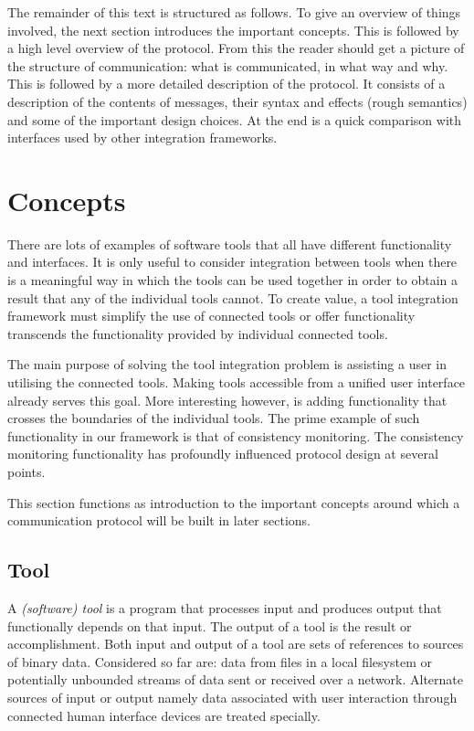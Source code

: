 \documentclass{article}
\begin{document}
  The remainder of this text is structured as follows. To give an overview of
  things involved, the next section introduces the important concepts. This is
  followed by a high level overview of the protocol. From this the reader
  should get a picture of the structure of communication: what is communicated,
  in what way and why. This is followed by a more detailed description of the
  protocol. It consists of a description of the contents of messages, their
  syntax and effects (rough semantics) and some of the important design
  choices.  At the end is a quick comparison with interfaces used by other
  integration frameworks.

 \section{Concepts}

   There are lots of examples of software tools that all have different
   functionality and interfaces. It is only useful to consider integration
   between tools when there is a meaningful way in which the tools can be used
   together in order to obtain a result that any of the individual tools
   cannot.  To create value, a tool integration framework must simplify the use
   of connected tools or offer functionality transcends the functionality
   provided by individual connected tools.
 
   The main purpose of solving the tool integration problem is assisting a user
   in utilising the connected tools. Making tools accessible from a unified
   user interface already serves this goal. More interesting however, is adding
   functionality that crosses the boundaries of the individual tools. The prime
   example of such functionality in our framework is that of consistency
   monitoring.  The consistency monitoring functionality has profoundly
   influenced protocol design at several points.
   
   This section functions as introduction to the important concepts around
   which a communication protocol will be built in later sections.

  \subsection{Tool}

   A \textit{(software) tool} is a program that processes input and produces
   output that functionally depends on that input. The output of a tool is the
   result or accomplishment. Both input and output of a tool are sets of
   references to sources of binary data. Considered so far are: data from files
   in a local filesystem or potentially unbounded streams of data sent or received
   over a network. Alternate sources of input or output namely data associated
   with user interaction through connected human interface devices are treated
   specially.
   
\end{document}

